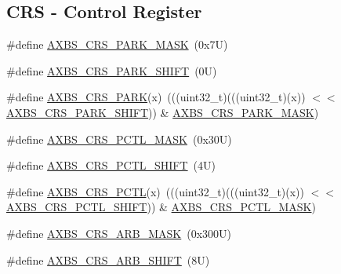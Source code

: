 \subsection*{C\+RS -\/ Control Register}
\begin{DoxyCompactItemize}
\item 
\#define \mbox{\hyperlink{group___a_x_b_s___register___masks_gadfcbad36cb3a462a0ddbb4fd7ec4dc6d}{A\+X\+B\+S\+\_\+\+C\+R\+S\+\_\+\+P\+A\+R\+K\+\_\+\+M\+A\+SK}}~(0x7\+U)
\item 
\#define \mbox{\hyperlink{group___a_x_b_s___register___masks_ga3beb82412a3e9fbd7712210fcb073d73}{A\+X\+B\+S\+\_\+\+C\+R\+S\+\_\+\+P\+A\+R\+K\+\_\+\+S\+H\+I\+FT}}~(0\+U)
\item 
\#define \mbox{\hyperlink{group___a_x_b_s___register___masks_ga50b3beac990e12ab15d0dbe05235bcee}{A\+X\+B\+S\+\_\+\+C\+R\+S\+\_\+\+P\+A\+RK}}(x)~(((uint32\+\_\+t)(((uint32\+\_\+t)(x)) $<$$<$ \mbox{\hyperlink{group___a_x_b_s___register___masks_ga3beb82412a3e9fbd7712210fcb073d73}{A\+X\+B\+S\+\_\+\+C\+R\+S\+\_\+\+P\+A\+R\+K\+\_\+\+S\+H\+I\+FT}})) \& \mbox{\hyperlink{group___a_x_b_s___register___masks_gadfcbad36cb3a462a0ddbb4fd7ec4dc6d}{A\+X\+B\+S\+\_\+\+C\+R\+S\+\_\+\+P\+A\+R\+K\+\_\+\+M\+A\+SK}})
\item 
\#define \mbox{\hyperlink{group___a_x_b_s___register___masks_gae9582bf93b9b0b8fa349ebb7e61ca312}{A\+X\+B\+S\+\_\+\+C\+R\+S\+\_\+\+P\+C\+T\+L\+\_\+\+M\+A\+SK}}~(0x30\+U)
\item 
\#define \mbox{\hyperlink{group___a_x_b_s___register___masks_ga010aca7f5f083633f9a2e1eb1e9e02e3}{A\+X\+B\+S\+\_\+\+C\+R\+S\+\_\+\+P\+C\+T\+L\+\_\+\+S\+H\+I\+FT}}~(4\+U)
\item 
\#define \mbox{\hyperlink{group___a_x_b_s___register___masks_gaf04c792a7641bdc9a55f66391e78809e}{A\+X\+B\+S\+\_\+\+C\+R\+S\+\_\+\+P\+C\+TL}}(x)~(((uint32\+\_\+t)(((uint32\+\_\+t)(x)) $<$$<$ \mbox{\hyperlink{group___a_x_b_s___register___masks_ga010aca7f5f083633f9a2e1eb1e9e02e3}{A\+X\+B\+S\+\_\+\+C\+R\+S\+\_\+\+P\+C\+T\+L\+\_\+\+S\+H\+I\+FT}})) \& \mbox{\hyperlink{group___a_x_b_s___register___masks_gae9582bf93b9b0b8fa349ebb7e61ca312}{A\+X\+B\+S\+\_\+\+C\+R\+S\+\_\+\+P\+C\+T\+L\+\_\+\+M\+A\+SK}})
\item 
\#define \mbox{\hyperlink{group___a_x_b_s___register___masks_ga18bef8f761d00bf46b543a96adb7eae3}{A\+X\+B\+S\+\_\+\+C\+R\+S\+\_\+\+A\+R\+B\+\_\+\+M\+A\+SK}}~(0x300\+U)
\item 
\#define \mbox{\hyperlink{group___a_x_b_s___register___masks_ga1b37d1aff0c53735798f6de4ead2cf16}{A\+X\+B\+S\+\_\+\+C\+R\+S\+\_\+\+A\+R\+B\+\_\+\+S\+H\+I\+FT}}~(8\+U)

\end{DoxyCompactItemize}
